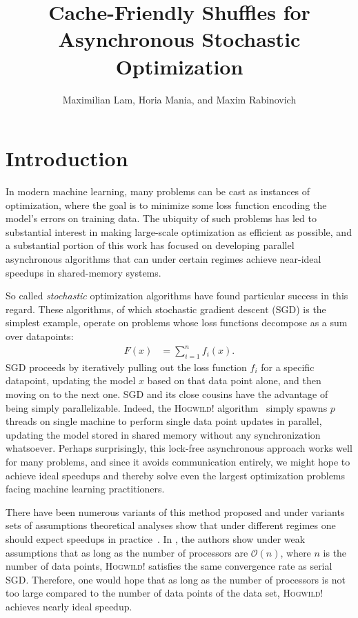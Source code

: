 \documentclass[times,11pt]{article}
\numberwithin{equation}{section}		%
\numberwithin{figure}{section}			%
\numberwithin{table}{section}				%
\newcommand{\HW}{\textsc{Hogwild!}}
\newcommand{\Ocal}{\mathcal{O}}
\begin{document}
\title{Cache-Friendly Shuffles for Asynchronous Stochastic Optimization}
\author{Maximilian Lam, Horia Mania, and Maxim Rabinovich}

\maketitle
\section{Introduction}

In modern machine learning, many problems can be cast as instances of optimization, where the goal is to minimize some loss
function encoding the model's errors on training data. The ubiquity of such problems has led to substantial interest in making large-scale
optimization as efficient as possible, and a substantial portion of this work has focused on 
developing parallel asynchronous  algorithms that can under certain regimes
achieve near-ideal speedups in shared-memory systems.

So called {\it stochastic} optimization algorithms have found particular success in this regard. These algorithms, of which stochastic gradient descent (SGD) is the simplest example, operate
on problems whose loss functions decompose as a sum over datapoints:
\begin{align}
\label{eq:main-loss}
F\left(x\right) & = \sum_{i = 1}^{n} f_{i}\left(x\right) .
\end{align}
SGD proceeds by iteratively pulling out the loss function $f_{i}$ for a specific datapoint, updating the model $x$ based on that data point alone, and then moving on to the next one.
SGD and its close cousins have the advantage of being simply parallelizable. Indeed, the \HW{} algorithm~\cite{niu2011hogwild} simply spawns $p$ threads on single machine to perform single data point updates in parallel, updating the model stored in shared memory without any synchronization whatsoever. Perhaps surprisingly, this lock-free asynchronous approach works well for many problems, and since it avoids communication entirely, we might hope to achieve ideal speedups and thereby solve even the largest optimization problems facing machine learning practitioners.

There have been numerous variants of this method proposed and under variants sets of assumptions theoretical analyses show that under different regimes one should expect speedups in practice~\cite{niu2011hogwild, lian2015asynchronous, reddi2015variance, de2015taming, liu2015asynchronous}. In \cite{mania2015perturbed}, the authors show under weak assumptions that as long as the number of processors are $\Ocal(n)$, where $n$ is the number of data points, \HW{} satisfies the same convergence rate as serial SGD. Therefore, one would hope that as long as the number of processors is not too large compared to the number of data points of the data set, \HW{} achieves nearly ideal speedup. 
\end{document}

